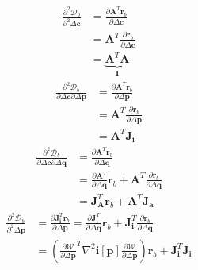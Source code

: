 \begin{equation}
    \begin{aligned}
		\frac{\partial^2 \mathcal{D}_b}{\partial^2 \Delta \mathbf{c}} & = \frac{\partial \mathbf{A}^T \mathbf{r}_b}{\partial \Delta \mathbf{c}} 
		\\
		& = \mathbf{A}^T \frac{\partial \mathbf{r}_b}{\partial \Delta \mathbf{c}} 
		\\
		& = \underbrace{\mathbf{A}^T \mathbf{A}}_{\mathbf{I}}
    \label{eq:bidirectional_hessian_term1}
    \end{aligned}
\end{equation}
\begin{equation}
    \begin{aligned}
		\frac{\partial^2 \mathcal{D}_b}{\partial \Delta \mathbf{c} \partial \Delta \mathbf{p}} & = \frac{\partial \mathbf{A}^T \mathbf{r}_b}{\partial \Delta \mathbf{p}} 
		\\
		& = \mathbf{A}^T \frac{\partial \mathbf{r}_b}{\partial \Delta \mathbf{p}} 
		\\
		& = \mathbf{A}^T \mathbf{J}_{\mathbf{i}}
    \label{eq:bidirectional_hessian_term2}
    \end{aligned}
\end{equation}
\begin{equation}
    \begin{aligned}
		\frac{\partial^2 \mathcal{D}_b}{\partial \Delta \mathbf{c} \partial \Delta \mathbf{q}} & =  \frac{\partial \mathbf{A}^T \mathbf{r}_b}{\partial \Delta \mathbf{q}} 
		\\
		&= \frac{\partial \mathbf{A}^T}{\partial \Delta \mathbf{q}} \mathbf{r}_b + \mathbf{A}^T \frac{\partial \mathbf{r}_b}{\partial \Delta \mathbf{q}} 
		\\
		& = \mathbf{J}_{\mathbf{A}}^T \mathbf{r}_b + \mathbf{A}^T \mathbf{J}_{\mathbf{a}}
    \label{eq:bidirectional_hessian_term3}
    \end{aligned}
\end{equation}
\begin{equation}
    \begin{aligned}
		\frac{\partial^2 \mathcal{D}_b}{\partial^2 \Delta \mathbf{p}} & =  \frac{\partial \mathbf{J}_{\mathbf{i}}^T \mathbf{r}_b}{\partial \Delta \mathbf{p}} = \frac{\partial \mathbf{J}_{\mathbf{i}}^T}{\partial \Delta \mathbf{q}} \mathbf{r}_b + \mathbf{J}_{\mathbf{i}}^T \frac{\partial \mathbf{r}_b}{\partial \Delta \mathbf{q}} 
		\\
		& = \left( \frac{\partial\mathcal{W}}{\partial \Delta \mathbf{p}}^T \nabla^2 \mathbf{i}[\mathbf{p}] \frac{\partial\mathcal{W}}{\partial \Delta \mathbf{p}} \right) \mathbf{r}_b + \mathbf{J}_{\mathbf{i}}^T \mathbf{J}_{\mathbf{i}}
    \label{q:bidirectional_hessian_term4}
    \end{aligned}
\end{equation}
